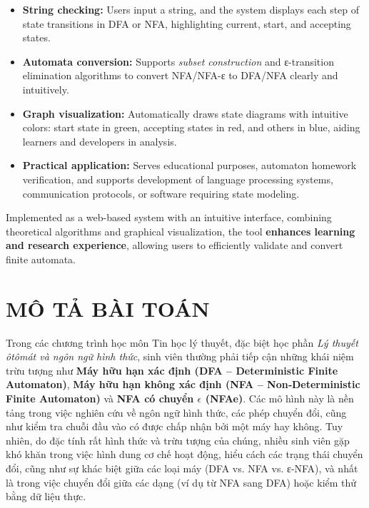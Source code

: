 \documentclass[12pt,a4paper]{report}
\begin{document}
\begin{itemize}
    \item \textbf{String checking:} Users input a string, and the system displays each step of state transitions in DFA or NFA, highlighting current, start, and accepting states.
    \item \textbf{Automata conversion:} Supports \textit{subset construction} and ε-transition elimination algorithms to convert NFA/NFA-ε to DFA/NFA clearly and intuitively.
    \item \textbf{Graph visualization:} Automatically draws state diagrams with intuitive colors: start state in green, accepting states in red, and others in blue, aiding learners and developers in analysis.
    \item \textbf{Practical application:} Serves educational purposes, automaton homework verification, and supports development of language processing systems, communication protocols, or software requiring state modeling.
\end{itemize}

\noindent
\hspace*{0.7cm}Implemented as a web-based system with an intuitive interface, combining theoretical algorithms and graphical visualization, the tool \textbf{enhances learning and research experience}, allowing users to efficiently validate and convert finite automata.

\newpage
\renewcommand{\contentsname}{\centering \MakeUppercase{MỤC LỤC}}
\tableofcontents

\newpage
{}
\setcounter{page}{1}
\pagestyle{plain}
\renewcommand{\listfigurename}{\centering \MakeUppercase{DANH MỤC HÌNH}}
\clearpage
{}
{} 
\listoffigures


\newpage
\chapter{MÔ TẢ BÀI TOÁN}

\hspace*{0.7cm}Trong các chương trình học môn Tin học lý thuyết, đặc biệt học phần \emph{Lý thuyết ôtômát và ngôn ngữ hình thức}, sinh viên thường phải tiếp cận những khái niệm trừu tượng như \textbf{Máy hữu hạn xác định (DFA – Deterministic Finite Automaton)}, \textbf{Máy hữu hạn không xác định (NFA – Non‑Deterministic Finite Automaton)} và \textbf{NFA có chuyển $\epsilon$ (NFAe)}. Các mô hình này là nền tảng trong việc nghiên cứu về ngôn ngữ hình thức, các phép chuyển đổi, cũng như kiểm tra chuỗi đầu vào có được chấp nhận bởi một máy hay không. Tuy nhiên, do đặc tính rất hình thức và trừu tượng của chúng, nhiều sinh viên gặp khó khăn trong việc hình dung cơ chế hoạt động, hiểu cách các trạng thái chuyển đổi, cũng như sự khác biệt giữa các loại máy (DFA vs. NFA vs. ε‑NFA), và nhất là trong việc chuyển đổi giữa các dạng (ví dụ từ NFA sang DFA) hoặc kiểm thử bằng dữ liệu thực.
\end{document}
